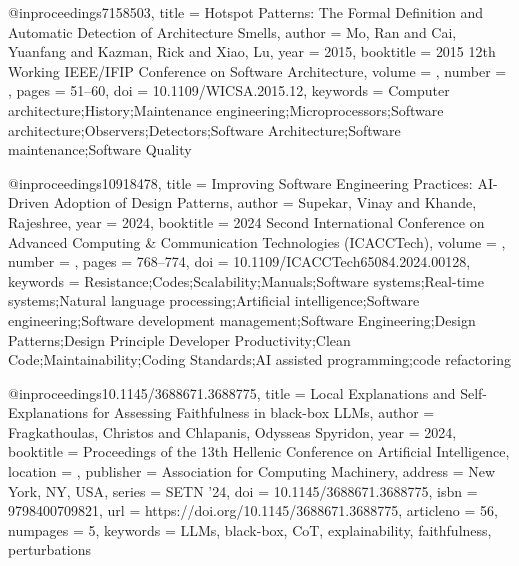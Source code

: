 @inproceedings{7158503,
title = {Hotspot Patterns: The Formal Definition and Automatic Detection of Architecture Smells},
author = {Mo, Ran and Cai, Yuanfang and Kazman, Rick and Xiao, Lu},
year = 2015,
booktitle = {2015 12th Working IEEE/IFIP Conference on Software Architecture},
volume = {},
number = {},
pages = {51--60},
doi = {10.1109/WICSA.2015.12},
keywords = {Computer architecture;History;Maintenance engineering;Microprocessors;Software architecture;Observers;Detectors;Software Architecture;Software maintenance;Software Quality}
}

@inproceedings{10918478,
title = {Improving Software Engineering Practices: AI-Driven Adoption of Design Patterns},
author = {Supekar, Vinay and Khande, Rajeshree},
year = 2024,
booktitle = {2024 Second International Conference on Advanced Computing & Communication Technologies (ICACCTech)},
volume = {},
number = {},
pages = {768--774},
doi = {10.1109/ICACCTech65084.2024.00128},
keywords = {Resistance;Codes;Scalability;Manuals;Software systems;Real-time systems;Natural language processing;Artificial intelligence;Software engineering;Software development management;Software Engineering;Design Patterns;Design Principle Developer Productivity;Clean Code;Maintainability;Coding Standards;AI assisted programming;code refactoring}
}

@inproceedings{10.1145/3688671.3688775,
title = {Local Explanations and Self-Explanations for Assessing Faithfulness in black-box LLMs},
author = {Fragkathoulas, Christos and Chlapanis, Odysseas Spyridon},
year = 2024,
booktitle = {Proceedings of the 13th Hellenic Conference on Artificial Intelligence},
location = {},
publisher = {Association for Computing Machinery},
address = {New York, NY, USA},
series = {SETN '24},
doi = {10.1145/3688671.3688775},
isbn = 9798400709821,
url = {https://doi.org/10.1145/3688671.3688775},
articleno = 56,
numpages = 5,
keywords = {LLMs, black-box, CoT, explainability, faithfulness, perturbations}
}

